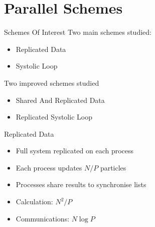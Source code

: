 \documentclass[xcolor={usenames, svgnames}]{beamer}
\begin{document}
\section{Parallel Schemes}

\begin{frame}{Schemes Of Interest}
    Two main schemes studied:
    \begin{itemize}
        \item Replicated Data
        \item Systolic Loop
    \end{itemize}

    Two improved schemes studied
    \begin{itemize}
        \item Shared And Replicated Data
        \item Replicated Systolic Loop
    \end{itemize}
\end{frame}


\newcommand{\rdpic}{
    \begin{center}
    \end{center}
}

\begin{frame}{Replicated Data}
    \rdpic{}

    \begin{itemize}
        \item Full system replicated on each process
        \item Each process updates $N/P$ particles
        \item Processes share results to synchronise lists
        \item Calculation: $N^2/P$
        \item Communications: $N\log{P}$
    \end{itemize}
\end{frame}
\end{document}
